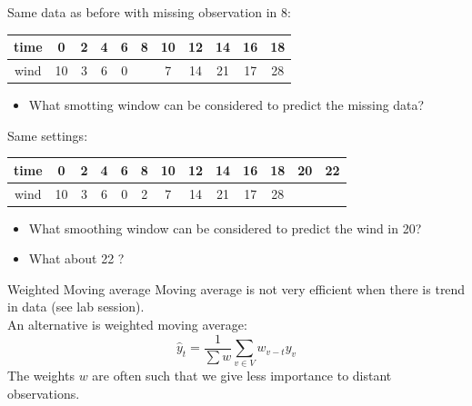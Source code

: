 \documentclass{beamer}
\begin{document}
\begin{frame}{}
\begin{example}
Same data as before with missing observation in 8:\\
\begin{center}
  \begin{tabular}{|c|cccccccccc|}
  \hline
  time & 0 	& 2 	& 4 	 & 6 	& 8 	& 10 	& 12 	& 14 	& 16 	& 18 	\\ \hline
  wind & 10	& 3 	& 6 	 & 0 	&    	& 7 	& 14 	& 21 	& 17 	& 28 	\\ \hline
  \end{tabular}
\end{center}
\begin{itemize}
	\item What smotting window can be considered to predict the missing data?
\end{itemize}
\end{example}
\end{frame}

\begin{frame}{}
\begin{example}[prediction]
Same settings:\\
\begin{center}
  \begin{tabular}{|c|cccccccccccc|}
  \hline
  time & 0 	& 2 	& 4 	 & 6 	& 8 	& 10 	& 12 	& 14 	& 16 	& 18 	& 20 	& 22 	\\ \hline
  wind & 10	& 3 	& 6 	 & 0 	& 2 	& 7 	& 14 	& 21 	& 17 	& 28 	&   	&   	\\ \hline
  \end{tabular}
\end{center}
\begin{itemize}
	\item What smoothing window can be considered to predict the wind in 20?
	\item What about 22 ?
\end{itemize}
\end{example}
\end{frame}

\begin{frame}{Weighted Moving average}
Moving average is not very efficient when there is trend in data (see lab session). \\
\vspace{5mm}
An alternative is weighted moving average:
$$\hat{y}_t = \frac{1}{\sum w} \sum_{v \in V} w_{v-t} y_v $$
The weights $w$ are often such that we give less importance to distant observations.
\end{frame}
\end{document}

